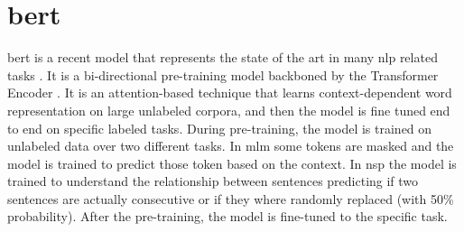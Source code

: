 \section{\acs{bert}}
\ac{bert} \cite{devlin2018bert} is a recent model that represents the
state of the art in many \ac{nlp} related tasks
\cite{chatterjee2019semeval,hu2019introductory,lee2019biobert,tshitoyan2019unsupervised}.
It is a
bi-directional pre-training model backboned by the Transformer Encoder
\cite{vaswani2017attention}. It is an attention-based technique that
learns context-dependent word representation on large unlabeled
corpora, and then the model is fine tuned end to end on specific labeled
tasks. During pre-training, the model is trained
on unlabeled data over two different tasks. In \ac{mlm} some tokens
are masked and the model is trained to predict those token based on
the context. In \ac{nsp} the model is trained to understand the
relationship between sentences predicting if two sentences are actually
consecutive or if they where randomly replaced (with 50\%
probability). After the pre-training, the model is fine-tuned to the
specific task.



